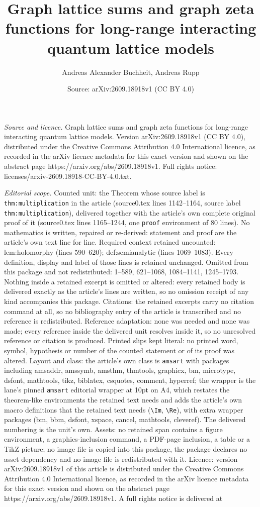 \documentclass[10pt,a4paper]{amsart}
\title[Graph lattice sums and graph zeta functions for long-range i]{Graph lattice sums and graph zeta functions for long-range interacting quantum lattice models}
\author{Andreas Alexander Buchheit, Andreas Rupp}
\date{Source: arXiv:2609.18918v1 (CC BY 4.0)}
\begin{document}
\maketitle

\noindent\emph{Source and licence.} Graph lattice sums and graph zeta functions for long-range interacting quantum lattice models. Version arXiv:2609.18918v1 (CC BY 4.0), distributed under the Creative Commons Attribution 4.0 International licence, as recorded in the arXiv licence metadata for this exact version and shown on the abstract page https://arxiv.org/abs/2609.18918v1. Full rights notice: licenses/arxiv-2609.18918-CC-BY-4.0.txt.\par\smallskip

\noindent\textit{Editorial scope.} Counted unit: the Theorem whose source label is \texttt{thm:multiplication} in the article (source0.tex lines 1142--1164, source label \texttt{thm:multiplication}), delivered together with the article's own complete original proof of it (source0.tex lines 1165--1244, one \texttt{proof} environment of 80 lines). No mathematics is written, repaired or re-derived: statement and proof are the article's own text line for line. Required context retained uncounted: lem:holomorphy (lines 590--620); def:semianalytic (lines 1069--1083). Every definition, display and label of those lines is retained unchanged. Omitted from this package and not redistributed: 1--589, 621--1068, 1084--1141, 1245--1793. Nothing inside a retained excerpt is omitted or altered: every retained body is delivered exactly as the article's lines are written, so no omission receipt of any kind accompanies this package. Citations: the retained excerpts carry no citation command at all, so no bibliography entry of the article is transcribed and no reference is redistributed. Reference adaptation: none was needed and none was made; every reference inside the delivered unit resolves inside it, so no unresolved reference or citation is produced. Printed slips kept literal: no printed word, symbol, hypothesis or number of the counted statement or of its proof was altered. Layout and class: the article's own class is \texttt{amsart} with packages including amsaddr, amssymb, amsthm, thmtools, graphicx, bm, microtype, dsfont, mathtools, tikz, biblatex, csquotes, comment, hyperref; the wrapper is the lane's pinned \texttt{amsart} editorial wrapper at 10pt on A4, which restates the theorem-like environments the retained text needs and adds the article's own macro definitions that the retained text needs (\texttt{\textbackslash Im}, \texttt{\textbackslash Re}), with extra wrapper packages (bm, bbm, dsfont, xspace, cancel, mathtools, cleveref). The delivered numbering is the unit's own. Assets: no retained span contains a figure environment, a graphics-inclusion command, a PDF-page inclusion, a table or a TikZ picture; no image file is copied into this package, the package declares no asset dependency and no image file is redistributed with it. Licence: version arXiv:2609.18918v1 of this article is distributed under the Creative Commons Attribution 4.0 International licence, as recorded in the arXiv licence metadata for this exact version and shown on the abstract page https://arxiv.org/abs/2609.18918v1. A full rights notice is delivered at 
\end{document}
